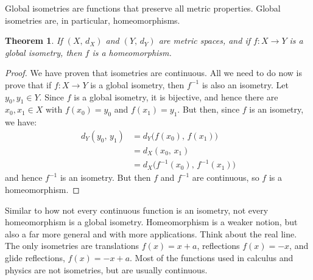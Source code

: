 \documentclass{article}
\theoremstyle{plain}
\newtheorem{theorem}{Theorem}[section]
\theoremstyle{normal}
\begin{document}
        Global isometries are functions that preserve all metric properties.
        Global isometries are, in particular, homeomorphisms.
        \begin{theorem}
            If $(X,\,d_{X})$ and $(Y,\,d_{Y})$ are metric spaces, and if
            $f:X\rightarrow{Y}$ is a global isometry, then $f$ is a
            homeomorphism.
        \end{theorem}
        \begin{proof}
            We have proven that isometries are continuous. All we need to do
            now is prove that if $f:X\rightarrow{Y}$ is a global isometry,
            then $f^{-1}$ is also an isometry. Let $y_{0},y_{1}\in{Y}$.
            Since $f$ is a global isometry, it is bijective, and hence there
            are $x_{0},x_{1}\in{X}$ with $f(x_{0})=y_{0}$ and $f(x_{1})=y_{1}$.
            But then, since $f$ is an isometry, we have:
            \begin{align}
                d_{Y}(y_{0},\,y_{1})
                    &=d_{Y}\big(f(x_{0}),\,f(x_{1})\big)\\
                    &=d_{X}(x_{0},\,x_{1})\\
                    &=d_{X}\big(f^{-1}(x_{0}),\,f^{-1}(x_{1})\big)
            \end{align}
            and hence $f^{-1}$ is an isometry. But then $f$ and $f^{-1}$ are
            continuous, so $f$ is a homeomorphism.
        \end{proof}
        Similar to how not every continuous function is an isometry, not every
        homeomorphism is a global isometry. Homeomorphism is a weaker notion,
        but also a far more general and with more applications. Think about
        the real line. The only isometries are translations
        $f(x)=x+a$, reflections $f(x)=-x$, and glide reflections,
        $f(x)=-x+a$. Most of the functions used in calculus and physics are not
        isometries, but are usually continuous.
\end{document}
